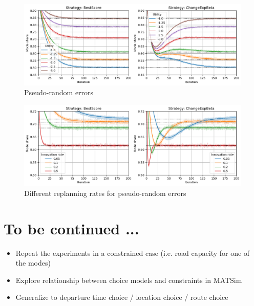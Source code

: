 \documentclass[a4paper]{article}
\begin{document}
\begin{figure}[h!]
    \centering
    \includegraphics[width=\textwidth]{images/errors.png}
    \caption{Pseudo-random errors}
    \label{fig:errors}
\end{figure}

\begin{figure}[h!]
    \centering
    \includegraphics[width=\textwidth]{images/replanning_rates.png}
    \caption{Different replanning rates for pseudo-random errors}
    \label{fig:replanning_rates}
\end{figure}

\section{To be continued ...}

\begin{itemize}
  \item Repeat the experiments in a constrained case (i.e. road capacity for one of the modes)
  \item Explore relationship between choice models and constraints in MATSim
  \item Generalize to departure time choice / location choice / route choice
\end{itemize}
\end{document}
